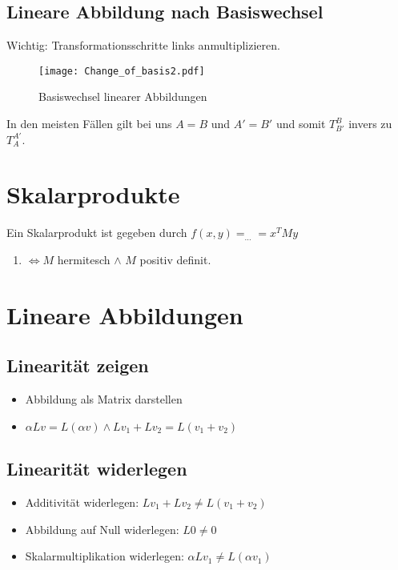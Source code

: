 \documentclass[a4paper]{article}
\begin{document}
\subsection{Lineare Abbildung nach Basiswechsel}

Wichtig: Transformationsschritte links anmultiplizieren.

\begin{figure}[H]
    \centering
    \texttt{[image: Change\_of\_basis2.pdf]}
    \caption{Basiswechsel linearer Abbildungen}
\end{figure}

In den meisten Fällen gilt bei uns $A=B$ und $ A'=B'$ und somit $T_{B'}^{B}$ invers zu $T_A^{A'}$. 

\section{Skalarprodukte}
Ein Skalarprodukt ist gegeben durch $f(x,y)= _{\dots} =x^T My$
\begin{enumerate}
    \item $\iff M$ hermitesch $\wedge$ $M$ positiv definit.
\end{enumerate}

\section{Lineare Abbildungen}
\subsection{Linearität zeigen}
\begin{itemize}
    \item Abbildung als Matrix darstellen
    \item $\alpha Lv = L(\alpha v) \wedge Lv_1 + Lv_2 = L(v_1+v_2)$
\end{itemize}

\subsection{Linearität widerlegen}
\begin{itemize}
    \item Additivität widerlegen: $Lv_1 + Lv_2 \neq L(v_1+v_2)$
    \item Abbildung auf Null widerlegen: $L0 \neq 0$
    \item Skalarmultiplikation widerlegen: $\alpha L v_1 \neq L(\alpha v_1)$
\end{itemize}
\end{document}
